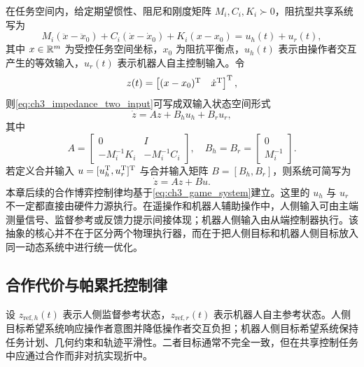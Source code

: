在任务空间内，给定期望惯性、阻尼和刚度矩阵 $M_i,C_i,K_i\succ0$，阻抗型共享系统写为
\begin{equation}
  M_i(\ddot x-\ddot x_0)+C_i(\dot x-\dot x_0)+K_i(x-x_0)=u_h(t)+u_r(t),
  \label{eq:ch3_impedance_two_input}
\end{equation}
其中 $x\in\mathbb{R}^m$ 为受控任务空间坐标，$x_0$ 为阻抗平衡点，$u_h(t)$ 表示由操作者交互产生的等效输入，$u_r(t)$ 表示机器人自主控制输入。令
\begin{equation}
  z(t)=\begin{bmatrix}(x-x_0)^{\mathrm{T}}&\dot x^{\mathrm{T}}\end{bmatrix}^{\mathrm{T}},
\end{equation}
则\eqref{eq:ch3_impedance_two_input}可写成双输入状态空间形式
\begin{equation}
  \dot z=Az+B_hu_h+B_ru_r,
  \label{eq:ch3_two_player_system}
\end{equation}
其中
\begin{equation}
  A=\begin{bmatrix}0&I\\-M_i^{-1}K_i&-M_i^{-1}C_i\end{bmatrix},\quad
  B_h=B_r=\begin{bmatrix}0\\M_i^{-1}\end{bmatrix} .
  \label{eq:ch3_AB_two_player}
\end{equation}
若定义合并输入 $u=[u_h^{\mathrm{T}},u_r^{\mathrm{T}}]^{\mathrm{T}}$ 与合并输入矩阵 $B=[B_h,B_r]$，则系统可简写为
\begin{equation}
  \dot z=Az+Bu .
  \label{eq:ch3_game_system}
\end{equation}
本章后续的合作博弈控制律均基于\eqref{eq:ch3_game_system}建立。这里的 $u_h$ 与 $u_r$ 不一定都直接由硬件力源执行。在遥操作和机器人辅助操作中，人侧输入可由主端测量信号、监督参考或反馈力提示间接体现；机器人侧输入由从端控制器执行。该抽象的核心并不在于区分两个物理执行器，而在于把人侧目标和机器人侧目标放入同一动态系统中进行统一优化。

\subsection{合作代价与帕累托控制律}
\label{subsec:ch3_game_costs}

设 $z_{\mathrm{ref},h}(t)$ 表示人侧监督参考状态，$z_{\mathrm{ref},r}(t)$ 表示机器人自主参考状态。人侧目标希望系统响应操作者意图并降低操作者交互负担；机器人侧目标希望系统保持任务计划、几何约束和轨迹平滑性。二者目标通常不完全一致，但在共享控制任务中应通过合作而非对抗实现折中。

